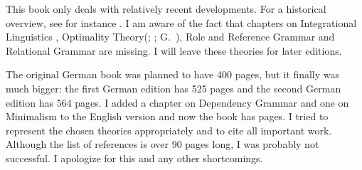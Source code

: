 This book only deals with relatively recent developments. For a historical overview, see for instance
. I am aware of the fact that chapters on
Integrational Linguistics
\citep{Lieb83a-u,Eisenberg2004a,Nolda2007a-u}, Optimality Theory\indexot (\citealp{PS93a-u};
\citealp{Grimshaw97a-u}; G.\ \citealp{GMueller2000a-u}), Role and Reference Grammar \citep{vanValin93a-ed} and Relational Grammar
\citep{Perlmutter83a-ed,Perlmutter84b-ed} are missing. I will leave these theories for later editions.

The original German book was planned to have 400 pages, but it finally was much bigger: the first
German edition has 525 pages and the second German edition has 564 pages. I
added a chapter on Dependency Grammar and one on Minimalism to the English version and now the
book has \pageref{LastPage} pages. I tried to represent the chosen theories appropriately and to cite all important work. Although the list of
references is over 90 pages long, I was probably not successful.
I apologize for this and any other shortcomings.

